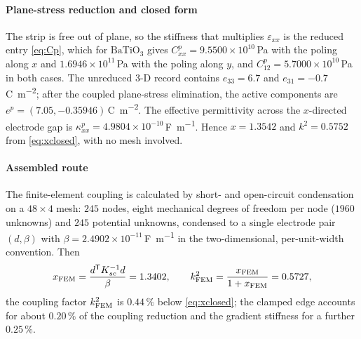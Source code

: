 \paragraph{Plane-stress reduction and closed form} The strip is free out of
plane, so the stiffness that multiplies $\varepsilon_{xx}$ is the reduced entry
\eqref{eq:Cp}, which for $\mathrm{BaTiO_3}$ gives
$C^{p}_{xx}=9.5500\times10^{10}$\,Pa with the poling along $x$ and
$1.6946\times10^{11}$\,Pa with the poling along $y$, and
$C^{p}_{12}=5.7000\times10^{10}$\,Pa in both cases. The unreduced 3-D record contains $e_{33}=6.7$ and $e_{31}=-0.7$\,\si{\coulomb\per\square\meter}; after the coupled plane-stress elimination, the active components are
$e^{p}=(7.05,-0.35946)$\,\si{\coulomb\per\square\meter}. The effective permittivity across the $x$-directed electrode gap is
$\kappa^{p}_{xx}=4.9804\times10^{-10}$\,\si{\farad\per\meter}. Hence
$x=1.3542$ and $k^{2}=0.5752$ from \eqref{eq:xclosed}, with no mesh involved.

\paragraph{Assembled route} The finite-element coupling is calculated by short- and open-circuit
condensation on a $48\times4$ mesh:
$245$ nodes, eight mechanical degrees of freedom per node ($1960$ unknowns)
and $245$ potential unknowns, condensed to a single electrode pair $(d,\beta)$
with $\beta=2.4902\times10^{-11}$\,\si{\farad\per\meter} in the two-dimensional, per-unit-width convention. Then
\begin{equation}
  x_{\rm FEM}=\frac{d^{\mathsf T}K_{sc}^{-1}d}{\beta}=1.3402,
  \qquad
  k^{2}_{\rm FEM}=\frac{x_{\rm FEM}}{1+x_{\rm FEM}}=0.5727 ,
  \label{eq:xFEM}
\end{equation}
the coupling factor $k^2_{\rm FEM}$ is $0.44\,\%$ below \eqref{eq:xclosed}; the clamped edge accounts for about $0.20\,\%$ of the coupling reduction
and the gradient stiffness for a further $0.25\,\%$.

